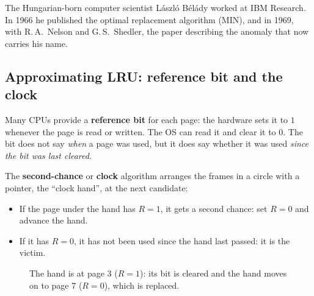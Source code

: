 \documentclass[11pt,a4paper]{article}
\newcommand{\term}[1]{\textbf{\color{mintdeep}#1}}
\begin{document}
\begin{histnote}
The Hungarian-born computer scientist László Bélády worked at IBM Research. In 1966 he published the optimal replacement algorithm (MIN), and in 1969, with R.\,A.\ Nelson and G.\,S.\ Shedler, the paper describing the anomaly that now carries his name.
\end{histnote}

\subsection{Approximating LRU: reference bit and the clock}
\label{sec:clock}

Many CPUs provide a \term{reference bit} for each page: the hardware sets it to $1$ whenever the page is read or written. The OS can read it and clear it to $0$. The bit does not say \emph{when} a page was used, but it does say whether it was used \emph{since the bit was last cleared}.

The \term{second-chance} or \term{clock} algorithm arranges the frames in a circle with a pointer, the ``clock hand'', at the next candidate:
\begin{itemize}
  \item If the page under the hand has $R = 1$, it gets a second chance: set $R = 0$ and advance the hand.
  \item If it has $R = 0$, it has not been used since the hand last passed: it is the victim.
\end{itemize}

\begin{figure}[H]
\centering
{}
\caption{The hand is at page 3 ($R=1$): its bit is cleared and the hand moves on to page 7 ($R=0$), which is replaced.}
\end{figure}
\end{document}
